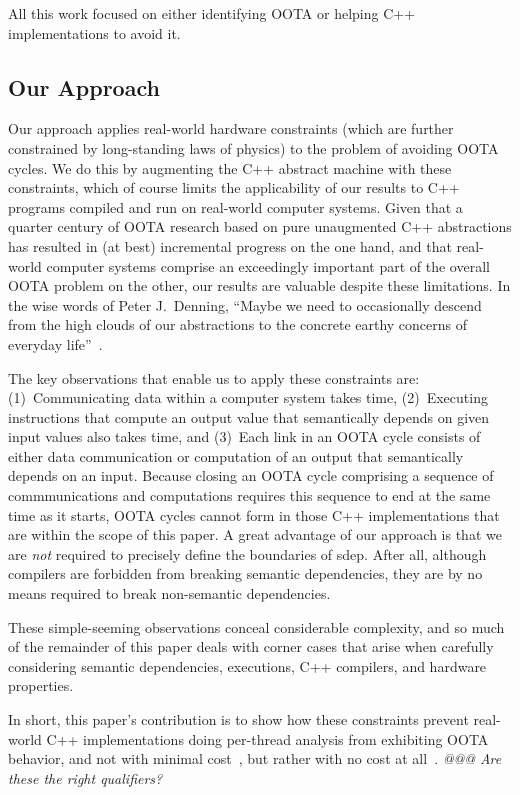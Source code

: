 All this work focused on either identifying OOTA or helping C++
implementations to avoid it.

\subsection{Our Approach}
\label{sec:Our Approach}

Our approach applies real-world hardware constraints (which are further
constrained by long-standing laws of physics) to the problem of avoiding
OOTA cycles.
We do this by augmenting the C++ abstract machine with these constraints,
which of course limits the applicability of our results to C++ programs
compiled and run on real-world computer systems.
Given that a quarter century of OOTA research based on pure unaugmented
C++ abstractions has resulted in (at best) incremental progress on the
one hand, and that real-world computer systems comprise an exceedingly
important part of the overall OOTA problem on the other, our results
are valuable despite these limitations.
In the wise words of Peter J.~Denning, ``Maybe we need to occasionally
descend from the high clouds of our abstractions to the concrete earthy
concerns of everyday life''~\cite{PeterJDenning2025Abstraction}.

The key observations that enable us to apply these constraints are:
(1)~Communicating data within a computer system takes time,
(2)~Executing instructions that compute an output value that semantically
depends on given input values also takes time,
and
(3)~Each link in an OOTA cycle consists of either data communication
or computation of an output that semantically depends on an input.
Because closing an OOTA cycle comprising a sequence of commmunications
and computations requires this sequence to end at the same time as it
starts, OOTA cycles cannot form in those C++ implementations that are
within the scope of this paper.
A great advantage of our approach is that we are \emph{not} required to
precisely define the boundaries of sdep.
After all, although compilers are forbidden from breaking semantic
dependencies, they are by no means required to break non-semantic
dependencies.

These simple-seeming observations conceal considerable complexity,
and so much of the remainder of this paper deals with corner cases that
arise when carefully considering semantic dependencies, executions, C++
compilers, and hardware properties.

In short, this paper's contribution is to show how these
constraints prevent real-world C++ implementations doing per-thread
analysis from exhibiting OOTA behavior, and not with minimal
cost~\cite{PiezhaoOu2018OOTApapl}, but rather with no cost at
all~\cite{PaulEMcKenney2023P3046R2/OOTAwithoutTrying}.
\emph{@@@ Are these the right qualifiers?}

